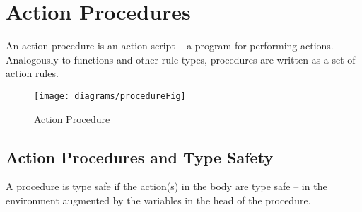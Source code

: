 \chapter{Action Procedures}
\label{procedures}

An action procedure is an action script -- a program for performing actions. Analogously to functions and other rule types, procedures are written as a set of action rules.

\begin{figure}[htbp]
   \texttt{[image: diagrams/procedureFig]}
   \caption{Action Procedure}
   \label{procedureFig}
\end{figure}

\section{Action Procedures and Type Safety}

A procedure is type safe if the action(s) in the body are type safe -- in the environment augmented by the variables in the head of the procedure.

\begin{prooftree}
\end{prooftree}